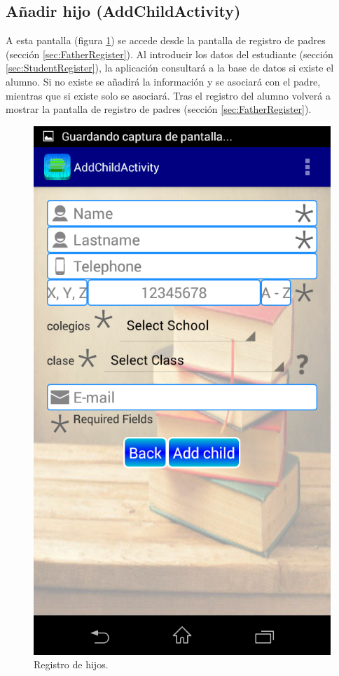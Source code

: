 		\subsection{Añadir hijo (AddChildActivity)} \label{sec:addChild}
			
			A esta pantalla (figura \ref{fig:addChildRegister}) se accede desde la pantalla de registro de padres (sección \ref{sec:FatherRegister}). Al introducir los datos del estudiante (sección \ref{sec:StudentRegister}), la aplicación consultará a la base de datos si existe el alumno. Si no existe se añadirá la información y se asociará con el padre, mientras que si existe solo se asociará. Tras el registro del alumno volverá a mostrar la pantalla de registro de padres (sección \ref{sec:FatherRegister}).
			
			\begin{figure}[h !]
				\centering
				\includegraphics[scale=0.2]{Imagenes/App/addChild}
				\caption{Registro de hijos.}
				\label{fig:addChildRegister}
			\end{figure}
		
